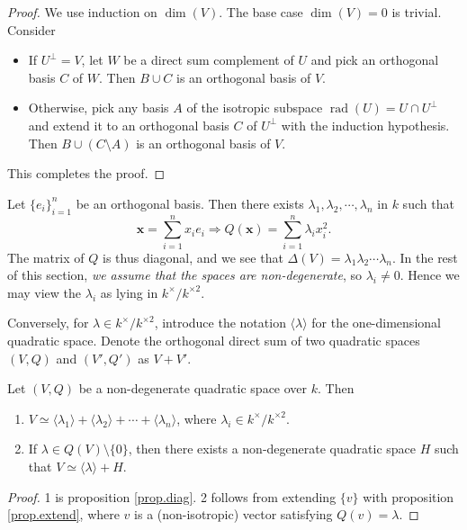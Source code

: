 \documentclass{article}
\newcommand{\rad}{\operatorname{rad}}
\begin{document}
\begin{proof}
    We use induction on $\dim(V)$. The base case $\dim(V)=0$ is trivial. Consider
    \begin{itemize}
        \item If $U^\bot=V$, let $W$ be a direct sum complement of $U$ and pick an orthogonal basis $C$ of $W$. Then $B\cup C$ is an orthogonal basis of $V$.
        \item Otherwise, pick any basis $A$ of the isotropic subspace $\rad(U)=U\cap U^\bot$ and extend it to an orthogonal basis $C$ of $U^\bot$ with the induction hypothesis. Then $B\cup (C\setminus A)$ is an orthogonal basis of $V$.
    \end{itemize}
    This completes the proof.
\end{proof}

Let $\{e_i\}_{i=1}^n$ be an orthogonal basis. Then there exists $\lambda_1,\lambda_2,\cdots,\lambda_n$ in $k$ such that
\begin{equation*}
    \mathbf{x}=\sum_{i=1}^n x_ie_i \Longrightarrow Q(\mathbf{x})=\sum_{i=1}^n \lambda_i x_i^2.
\end{equation*}
The matrix of $Q$ is thus diagonal, and we see that $\Delta(V)=\lambda_1\lambda_2\cdots\lambda_n$. In the rest of this section, \emph{we assume that the spaces are non-degenerate}, so $\lambda_i\neq 0$. Hence we may view the $\lambda_i$ as lying in $k^\times/k^{\times 2}$.

Conversely, for $\lambda\in k^{\times}/k^{\times 2}$, introduce the notation $\langle\lambda\rangle$ for the one-dimensional quadratic space. Denote the orthogonal direct sum of two quadratic spaces $(V,Q)$ and $(V',Q')$ as $V+V'$.
\begin{corollary}
    Let $(V,Q)$ be a non-degenerate quadratic space over $k$. Then
    \begin{enumerate}
        \item $V\simeq \langle\lambda_1\rangle+\langle\lambda_2\rangle+\cdots+\langle\lambda_n\rangle$, where $\lambda_i\in k^\times/k^{\times 2}$.
        \item If $\lambda\in Q(V)\setminus \{0\}$, then there exists a non-degenerate quadratic space $H$ such that $V\simeq \langle\lambda\rangle+H$.
    \end{enumerate}
\end{corollary}

\begin{proof}
    1 is proposition \ref{prop.diag}. 2 follows from extending $\{v\}$ with proposition \ref{prop.extend}, where $v$ is a (non-isotropic) vector satisfying $Q(v)=\lambda$. 
\end{proof}
    
\end{document}

